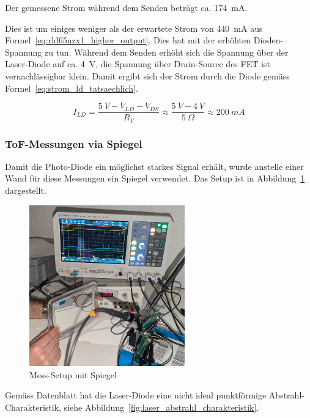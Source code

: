 Der gemessene Strom während dem Senden beträgt ca. 174~mA.

Dies ist um einiges weniger als der erwartete Strom von 440~mA aus Formel~\ref{eq:rld65nzx1_higher_output}. Dies hat mit
der erhöhten Dioden-Spannung zu tun. Während dem Senden erhöht sich die Spannung über der Laser-Diode auf ca. 4~V, die
Spannung über Drain-Source des FET ist vernachlässigbar klein. Damit ergibt sich der Strom durch die Diode gemäss
Formel~\ref{eq:strom_ld_tatsaechlich}.

\begin{equation}\label{eq:strom_ld_tatsaechlich}
    I_{LD} = \frac{5~V - V_{LD} - V_{DS}}{R_V} \approx \frac{5~V - 4~V}{5~\Omega} \approx 200~mA
\end{equation}

\subsubsection{ToF-Messungen via Spiegel}\label{sec:messungen_spiegel}

Damit die Photo-Diode ein möglichst starkes Signal erhält, wurde anstelle einer Wand für diese Messungen ein Spiegel
verwendet. Das Setup ist in Abbildung~\ref{fig:spiegel_setup} dargestellt.

\begin{figure}[H]
    \centering
    \includegraphics[width=0.6\textwidth]{graphics/spiegel_setup.jpg}
    \caption{Mess-Setup mit Spiegel}\label{fig:spiegel_setup}
\end{figure}

Gemäss Datenblatt hat die Laser-Diode eine nicht ideal punktförmige Abstrahl-Charakteristik, siehe
Abbildung~\ref{fig:laser_abstrahl_charakteristik}.

